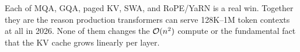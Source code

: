 Each of MQA, GQA, paged KV, SWA, and RoPE/YaRN is a real win. Together
they are the reason production transformers can serve 128K--1M token
contexts at all in 2026. None of them changes the \(\mathcal{O}(n^2)\) compute
or the fundamental fact that the KV cache grows linearly per layer.

